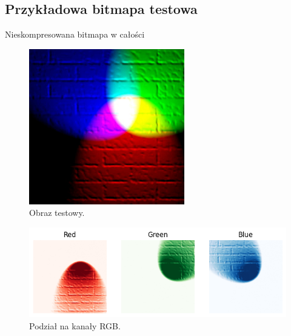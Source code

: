 \documentclass[11pt, leqno]{scrartcl}
\begin{document}
    \subsection{Przykładowa bitmapa testowa}
    Nieskompresowana bitmapa w całości
    \begin{figure}[H]
        \centering
        \includegraphics[width=0.5\linewidth]{rgb3.png}
        \caption{Obraz testowy.}
    \end{figure}
    \begin{figure}[H]
        \centering
        \includegraphics[width=1\linewidth]{rgb3_channels.png}
        \caption{Podział na kanały RGB.}
    \end{figure}
\end{document}
